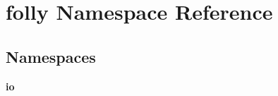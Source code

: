 \section{folly Namespace Reference}
\label{namespacefolly}
\subsection*{Namespaces}
\begin{DoxyCompactItemize}
\item 
 {\bf io}
\end{DoxyCompactItemize}
